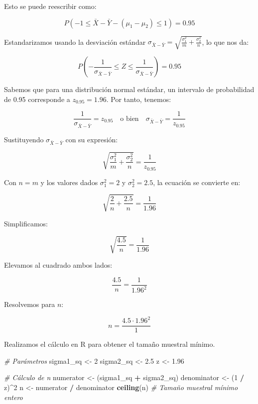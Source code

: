 \documentclass[
]{article}
\newenvironment{Shaded}{\begin{snugshade}}{\end{snugshade}}
\newcommand{\CommentTok}[1]{\textcolor[rgb]{0.56,0.35,0.01}{\textit{#1}}}
\newcommand{\DecValTok}[1]{\textcolor[rgb]{0.00,0.00,0.81}{#1}}
\newcommand{\FloatTok}[1]{\textcolor[rgb]{0.00,0.00,0.81}{#1}}
\newcommand{\FunctionTok}[1]{\textcolor[rgb]{0.13,0.29,0.53}{\textbf{#1}}}
\newcommand{\NormalTok}[1]{#1}
\newcommand{\OtherTok}[1]{\textcolor[rgb]{0.56,0.35,0.01}{#1}}
\newcommand{\SpecialCharTok}[1]{\textcolor[rgb]{0.81,0.36,0.00}{\textbf{#1}}}
\begin{document}
Esto se puede reescribir como:

\[
P\left(-1 \leq \bar{X} - \bar{Y} - (\mu_1 - \mu_2) \leq 1\right) = 0.95
\]

Estandarizamos usando la desviación estándar \(\sigma_{\bar{X} - \bar{Y}} = \sqrt{\frac{\sigma_1^2}{m} + \frac{\sigma_2^2}{n}}\), lo que nos da:

\[
P\left(-\frac{1}{\sigma_{\bar{X} - \bar{Y}}} \leq Z \leq \frac{1}{\sigma_{\bar{X} - \bar{Y}}}\right) = 0.95
\]

Sabemos que para una distribución normal estándar, un intervalo de probabilidad de 0.95 corresponde a \(z_{0.95} = 1.96\). Por tanto, tenemos:

\[
\frac{1}{\sigma_{\bar{X} - \bar{Y}}} = z_{0.95} \quad \text{o bien} \quad \sigma_{\bar{X} - \bar{Y}} = \frac{1}{z_{0.95}}
\]

Sustituyendo \(\sigma_{\bar{X} - \bar{Y}}\) con su expresión:

\[
\sqrt{\frac{\sigma_1^2}{m} + \frac{\sigma_2^2}{n}} = \frac{1}{z_{0.95}}
\]

Con \(n = m\) y los valores dados \(\sigma_1^2 = 2\) y \(\sigma_2^2 = 2.5\), la ecuación se convierte en:

\[
\sqrt{\frac{2}{n} + \frac{2.5}{n}} = \frac{1}{1.96}
\]

Simplificamos:

\[
\sqrt{\frac{4.5}{n}} = \frac{1}{1.96}
\]

Elevamos al cuadrado ambos lados:

\[
\frac{4.5}{n} = \frac{1}{1.96^2}
\]

Resolvemos para \(n\):

\[
n = \frac{4.5 \cdot 1.96^2}{1}
\]

Realizamos el cálculo en R para obtener el tamaño muestral mínimo.

\begin{Shaded}
\begin{Highlighting}[]
\CommentTok{\# Parámetros}
\NormalTok{sigma1\_sq }\OtherTok{\textless{}{-}} \DecValTok{2}
\NormalTok{sigma2\_sq }\OtherTok{\textless{}{-}} \FloatTok{2.5}
\NormalTok{z }\OtherTok{\textless{}{-}} \FloatTok{1.96}

\CommentTok{\# Cálculo de n}
\NormalTok{numerator }\OtherTok{\textless{}{-}}\NormalTok{ (sigma1\_sq }\SpecialCharTok{+}\NormalTok{ sigma2\_sq)}
\NormalTok{denominator }\OtherTok{\textless{}{-}}\NormalTok{ (}\DecValTok{1} \SpecialCharTok{/}\NormalTok{ z)}\SpecialCharTok{\^{}}\DecValTok{2}
\NormalTok{n }\OtherTok{\textless{}{-}}\NormalTok{ numerator }\SpecialCharTok{/}\NormalTok{ denominator}
\FunctionTok{ceiling}\NormalTok{(n) }\CommentTok{\# Tamaño muestral mínimo entero}
\end{Highlighting}
\end{Shaded}
\end{document}
